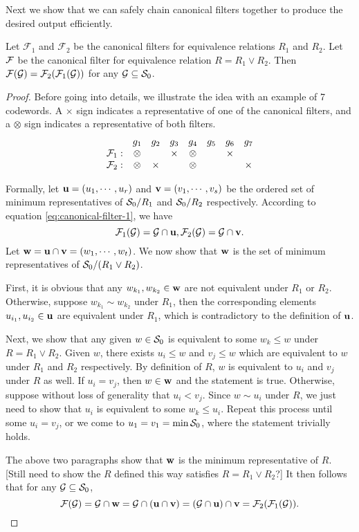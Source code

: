 Next we show that we can safely chain canonical filters together to produce the desired output efficiently.

\begin{theorem}
Let $\mathcal{F}_1$ and $\mathcal{F}_2$ be the canonical filters for equivalence relations $R_1$ and $R_2$. Let $\mathcal{F}$ be the canonical filter for equivalence relation $R = R_1 \vee R_2$. Then $\mathcal{F}(\mathcal{G}) = \mathcal{F}_2(\mathcal{F}_1(\mathcal{G}))$ for any $\mathcal{G} \subseteq \mathcal{S}_0$.
\end{theorem}

\begin{proof}
Before going into details, we illustrate the idea with an example of 7 codewords. A $\times$ sign indicates a representative of one of the canonical filters, and a $\otimes$ sign indicates a representative of both filters.
\[
\begin{array}{r c c c c c c c }
      & g_1 & g_2 & g_3 & g_4 & g_5 & g_6 & g_7 \\
\mathcal{F}_1: & \otimes &        & \times & \otimes & & \times & \\
\mathcal{F}_2: & \otimes & \times &        & \otimes & &        & \times
\end{array}
\]

Formally, let $\mathbf{u} = (u_1, \cdots, u_r)$ and $\mathbf{v} = (v_1, \cdots, v_s)$ be the ordered set of minimum representatives of $\mathcal{S}_0 / R_1$ and $\mathcal{S}_0 / R_2$ respectively. According to equation \eqref{eq:canonical-filter-1}, we have
\[
\mathcal{F}_1(\mathcal{G}) = \mathcal{G} \cap \mathbf{u}, \mathcal{F}_2(\mathcal{G}) = \mathcal{G} \cap \mathbf{v}.
\]
Let $\mathbf{w} = \mathbf{u} \cap \mathbf{v} = (w_1, \cdots, w_t)$. We now show that $\mathbf{w}$ is the set of minimum representatives of $\mathcal{S}_0 / (R_1 \vee R_2)$.

First, it is obvious that any $w_{k_1}, w_{k_2} \in \mathbf{w}$ are not equivalent under $R_1$ or $R_2$. Otherwise, suppose $w_{k_1} \sim w_{k_2}$ under $R_1$, then the corresponding elements $u_{i_1}, u_{i_2} \in \mathbf{u}$ are equivalent under $R_1$, which is contradictory to the definition of $\mathbf{u}$.

Next, we show that any given $w \in \mathcal{S}_0$ is equivalent to some $w_k \le w$ under $R = R_1 \vee R_2$. Given $w$, there exists $u_i \le w$ and $v_j \le w$ which are equivalent to $w$ under $R_1$ and $R_2$ respectively. By definition of $R$, $w$ is equivalent to $u_i$ and $v_j$ under $R$ as well. If $u_i = v_j$, then $w \in \mathbf{w}$ and the statement is true. Otherwise, suppose without loss of generality that $u_i < v_j$. Since $w \sim u_i$ under $R$, we just need to show that $u_i$ is equivalent to some $w_k \le u_i$. Repeat this process until some $u_i = v_j$, or we come to $u_1 = v_1 = \min \mathcal{S}_0$, where the statement trivially holds.

The above two paragraphs show that $\mathbf{w}$ is the minimum representative of $R$. [Still need to show the $R$ defined this way satisfies $R = R_1 \vee R_2$?] It then follows that for any $\mathcal{G} \subseteq \mathcal{S}_0$,
\[
\mathcal{F}(\mathcal{G}) = \mathcal{G} \cap \mathbf{w} = \mathcal{G} \cap (\mathbf{u} \cap \mathbf{v} ) = (\mathcal{G} \cap \mathbf{u}) \cap \mathbf{v}
= \mathcal{F}_2(\mathcal{F}_1(\mathcal{G})) .
\]

\end{proof}

